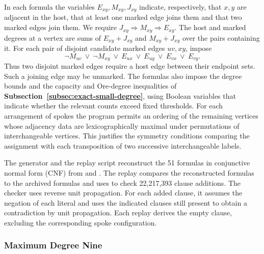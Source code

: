 In each formula the variables $E_{xy},M_{xy},J_{xy}$
indicate, respectively, that $x,y$ are adjacent in the host,
that at least one marked edge joins them and that two marked edges
join them. We require
$J_{xy}\Rightarrow M_{xy}\Rightarrow E_{xy}$. The host
and marked degrees at a vertex are sums of $E_{xy}+J_{xy}$
and $M_{xy}+J_{xy}$ over the pairs containing it. For each
pair of disjoint candidate marked edges $uv,xy$, impose
\begin{equation}\label{eq:multi-sat-witness}
 \neg M_{uv}\ \lor\ \neg M_{xy}\ \lor\
 E_{ux}\ \lor\ E_{uy}\ \lor\ E_{vx}\ \lor\ E_{vy}.
\end{equation}
Thus two disjoint marked edges require a host edge between their
endpoint sets. Such a joining edge may be unmarked. The
formulas also impose the degree bounds and the capacity and
Ore-degree inequalities of \textbf{Subsection~\ref{subsec:exact-small-degree}}, using Boolean variables that
indicate whether the relevant counts exceed fixed
thresholds.
For each arrangement of spokes the program permits an ordering of the
remaining vertices whose adjacency data are lexicographically maximal
under permutations of interchangeable vertices. This justifies the
symmetry conditions comparing the assignment with each transposition
of two successive interchangeable labels.

The generator  and the replay
script  reconstruct the
51 formulas in conjunctive normal form (CNF) from
 and
. The replay compares the
reconstructed formulas to the archived formulas and uses
 to check 22,217,393 clause additions.
The checker uses reverse unit propagation. For each added
clause, it assumes the negation of each literal and uses
the indicated clauses still present to obtain a
contradiction by unit propagation. Each replay derives
the empty clause, excluding the corresponding spoke
configuration.

\subsubsection{Maximum Degree Nine}\label{app:multi-nine}

